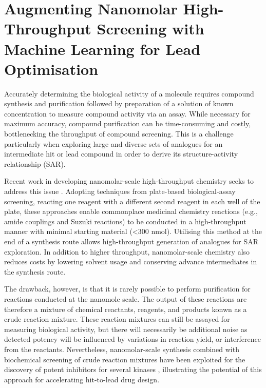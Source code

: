 \chapter{Augmenting Nanomolar High-Throughput Screening with Machine Learning for Lead Optimisation} \label{ch:testing}

Accurately determining the biological activity of a molecule requires compound synthesis and purification followed by preparation of a solution of known concentration to measure compound activity via an assay. While necessary for maximum accuracy, compound purification can be time-consuming and costly, bottlenecking the throughput of compound screening. This is a challenge particularly when exploring large and diverse sets of analogues for an intermediate hit or lead compound in order to derive its structure-activity relationship (SAR).

Recent work in developing nanomolar-scale high-throughput chemistry seeks to address this issue \cite{Santarilla2015MerckNanomolar, Perera2018PfizerNanomolar, Gehrtz2022nanomolar}. Adopting techniques from plate-based biological-assay screening, reacting one reagent with a different second reagent in each well of the plate, these approaches enable commonplace medicinal chemistry reactions (e.g., amide couplings and Suzuki reactions) to be conducted in a high-throughput manner with minimal starting material (<300 nmol). Utilising this method at the end of a synthesis route allows high-throughput generation of analogues for SAR exploration. In addition to higher throughput, nanomolar-scale chemistry also reduces costs by lowering solvent usage and conserving advance intermediates in the synthesis route. 

The drawback, however, is that it is rarely possible to perform purification for reactions conducted at the nanomole scale. The output of these reactions are therefore a mixture of chemical reactants, reagents, and products konwn as a crude reaction mixture. These reaction mixtures can still be assayed for measuring biological activity, but there will necessarily be additional noise as detected potency will be influenced by variations in reaction yield, or interference from the reactants. Nevertheless, nanomolar-scale synthesis combined with biochemical screening of crude reaction mixtures have been exploited for the discovery of potent inhibitors for several kinases \cite{Gesmundo2018nanosar, Gehrtz2022nanomolar}, illustrating the potential of this approach for accelerating hit-to-lead drug design.

